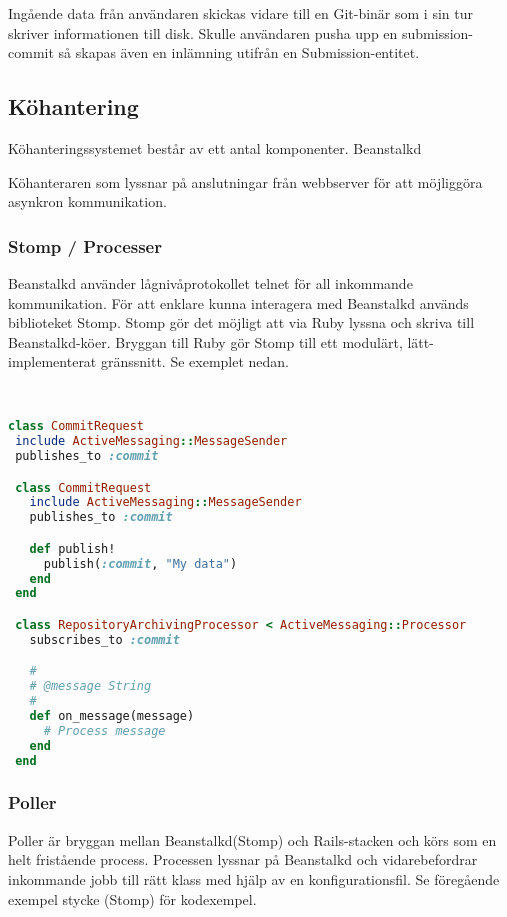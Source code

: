 Ingående data från användaren skickas vidare till en Git-binär som i sin tur skriver informationen till disk. Skulle användaren pusha upp en submission-commit så skapas även en inlämning utifrån en Submission-entitet.
\subsection{Köhantering}
Köhanteringssystemet består av ett antal komponenter.
Beanstalkd

Köhanteraren som lyssnar på anslutningar från webbserver för att möjliggöra asynkron kommunikation.


\subsubsection{Stomp / Processer}

Beanstalkd använder lågnivåprotokollet telnet för all inkommande kommunikation. För att enklare kunna interagera med Beanstalkd används biblioteket Stomp. Stomp gör det möjligt att via Ruby lyssna och skriva till Beanstalkd-köer. Bryggan till Ruby gör Stomp till ett modulärt, lätt-implementerat gränssnitt. Se exemplet nedan.

\begin{lstlisting}[language=Ruby, showstringspaces=false]


class CommitRequest
 include ActiveMessaging::MessageSender
 publishes_to :commit

 class CommitRequest
   include ActiveMessaging::MessageSender
   publishes_to :commit

   def publish!
     publish(:commit, "My data")
   end
 end

 class RepositoryArchivingProcessor < ActiveMessaging::Processor
   subscribes_to :commit

   #
   # @message String
   #
   def on_message(message)
     # Process message
   end
 end
\end{lstlisting}

\subsubsection{Poller}

Poller är bryggan mellan Beanstalkd(Stomp) och Rails-stacken och körs som en helt fristående process. Processen lyssnar på Beanstalkd och vidarebefordrar inkommande jobb till rätt klass med hjälp av en konfigurationsfil. Se föregående exempel stycke (Stomp) för kodexempel.

